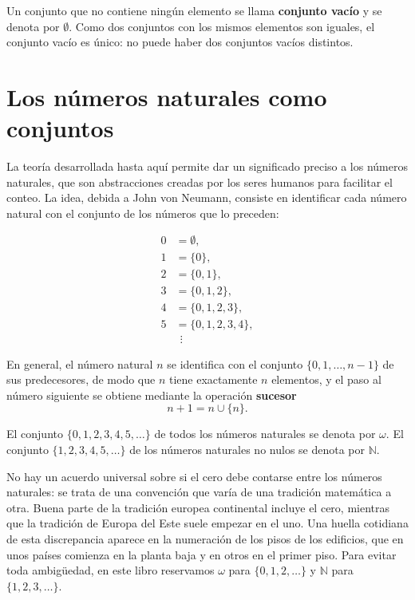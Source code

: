 Un conjunto que no contiene ningún elemento se llama \textbf{conjunto vacío} y se denota por
$\emptyset$. Como dos conjuntos con los mismos elementos son iguales, el conjunto vacío es único: no puede haber dos
conjuntos vacíos distintos.

\section{Los números naturales como conjuntos}

La teoría desarrollada hasta aquí permite dar un significado preciso a los números naturales, que son abstracciones
creadas por los seres humanos para facilitar el conteo. La idea, debida a John von Neumann, consiste en identificar
cada número natural con el conjunto de los números que lo preceden:

\[
    \begin{aligned}
        0 & = \emptyset,         \\
        1 & = \{0\},             \\
        2 & = \{0, 1\},          \\
        3 & = \{0, 1, 2\},       \\
        4 & = \{0, 1, 2, 3\},    \\
        5 & = \{0, 1, 2, 3, 4\}, \\
          & \ \ \vdots
    \end{aligned}
\]

En general, el número natural $n$ se identifica con el conjunto $\{0, 1, \ldots, n-1\}$ de sus predecesores, de modo
que $n$ tiene exactamente $n$ elementos, y el paso al número siguiente se obtiene mediante la operación
\textbf{sucesor}
\[
    n + 1 = n \cup \{n\}.
\]

El conjunto $\{0, 1, 2, 3, 4, 5, \ldots\}$ de todos los números naturales se denota por $\omega$. El conjunto $\{1, 2,
    3, 4, 5, \ldots\}$ de los números naturales no nulos se denota por $\mathbb{N}$.

\begin{remark}
    No hay un acuerdo universal sobre si el cero debe contarse entre los números naturales: se trata de una convención
    que varía de una tradición matemática a otra. Buena parte de la tradición europea continental incluye el cero,
    mientras que la tradición de Europa del Este suele empezar en el uno. Una huella cotidiana de esta discrepancia
    aparece en la numeración de los pisos de los edificios, que en unos países comienza en la planta baja y en otros
    en el primer piso. Para evitar toda ambigüedad, en este libro reservamos $\omega$ para $\{0, 1, 2, \ldots\}$ y
    $\mathbb{N}$ para $\{1, 2, 3, \ldots\}$.
\end{remark}

